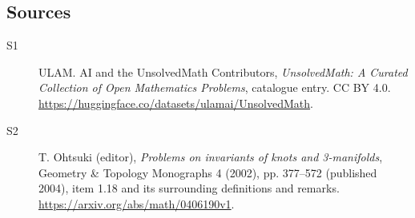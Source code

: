\documentclass[11pt]{article}
\begin{document}
\subsection{Sources}
\begin{description}
\item[\hypertarget{source:statement:1}{S1}] ULAM. AI and the UnsolvedMath Contributors, \emph{UnsolvedMath: A Curated Collection of Open Mathematics Problems}, catalogue entry. CC BY 4.0. \url{https://huggingface.co/datasets/ulamai/UnsolvedMath}.
\item[\hypertarget{source:statement:2}{S2}] T. Ohtsuki (editor), \emph{Problems on invariants of knots and 3-manifolds}, Geometry \& Topology Monographs 4 (2002), pp. 377--572 (published 2004), item 1.18 and its surrounding definitions and remarks. \url{https://arxiv.org/abs/math/0406190v1}.
\end{description}
\label{end:statement}
\end{document}
